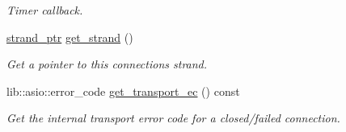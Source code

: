 \begin{DoxyCompactItemize}
\begin{DoxyCompactList}\small\item\em Timer callback. \end{DoxyCompactList}\item 
\hyperlink{classwebsocketpp_1_1transport_1_1asio_1_1connection_ad960008bc6449e5c74e041d21a5c05e4}{strand\+\_\+ptr} \hyperlink{classwebsocketpp_1_1transport_1_1asio_1_1connection_a1d636545ad5cc7d78ddcff414fd55d0a}{get\+\_\+strand} ()
\begin{DoxyCompactList}\small\item\em Get a pointer to this connection\textquotesingle{}s strand. \end{DoxyCompactList}\item 
lib\+::asio\+::error\+\_\+code \hyperlink{classwebsocketpp_1_1transport_1_1asio_1_1connection_a268b12471be913bdef56b1c3b3e2dde7}{get\+\_\+transport\+\_\+ec} () const 
\begin{DoxyCompactList}\small\item\em Get the internal transport error code for a closed/failed connection. \end{DoxyCompactList}\end{DoxyCompactItemize}
